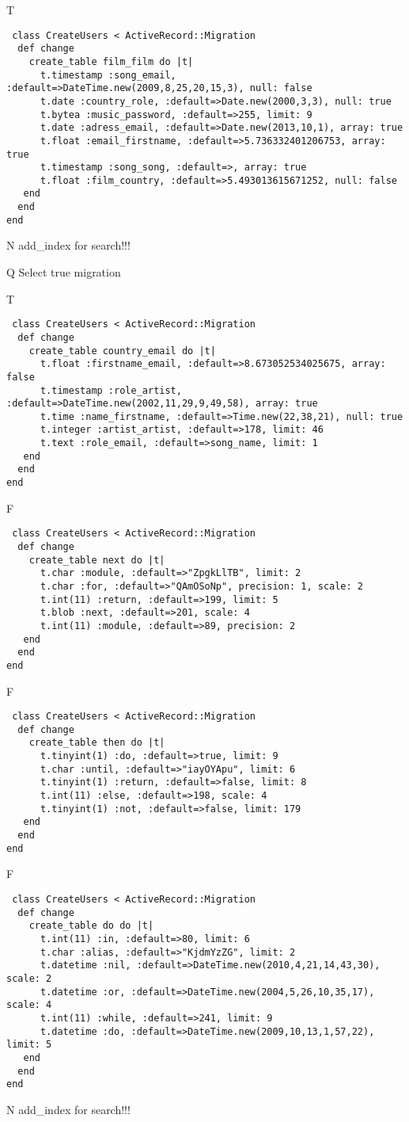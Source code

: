 T
\begin{verbatim}
 class CreateUsers < ActiveRecord::Migration 
  def change 
    create_table film_film do |t| 
      t.timestamp :song_email, :default=>DateTime.new(2009,8,25,20,15,3), null: false
      t.date :country_role, :default=>Date.new(2000,3,3), null: true
      t.bytea :music_password, :default=>255, limit: 9
      t.date :adress_email, :default=>Date.new(2013,10,1), array: true
      t.float :email_firstname, :default=>5.736332401206753, array: true
      t.timestamp :song_song, :default=>, array: true
      t.float :film_country, :default=>5.493013615671252, null: false
   end 
  end 
end
\end{verbatim}
N
add_index for search!!!
  
Q
Select true migration

T
\begin{verbatim}
 class CreateUsers < ActiveRecord::Migration 
  def change 
    create_table country_email do |t| 
      t.float :firstname_email, :default=>8.673052534025675, array: false
      t.timestamp :role_artist, :default=>DateTime.new(2002,11,29,9,49,58), array: true
      t.time :name_firstname, :default=>Time.new(22,38,21), null: true
      t.integer :artist_artist, :default=>178, limit: 46
      t.text :role_email, :default=>song_name, limit: 1
   end 
  end 
end
\end{verbatim}

F
\begin{verbatim}
 class CreateUsers < ActiveRecord::Migration 
  def change 
    create_table next do |t| 
      t.char :module, :default=>"ZpgkLlTB", limit: 2
      t.char :for, :default=>"QAmOSoNp", precision: 1, scale: 2
      t.int(11) :return, :default=>199, limit: 5
      t.blob :next, :default=>201, scale: 4
      t.int(11) :module, :default=>89, precision: 2
   end 
  end 
end
\end{verbatim}

F
\begin{verbatim}
 class CreateUsers < ActiveRecord::Migration 
  def change 
    create_table then do |t| 
      t.tinyint(1) :do, :default=>true, limit: 9
      t.char :until, :default=>"iayOYApu", limit: 6
      t.tinyint(1) :return, :default=>false, limit: 8
      t.int(11) :else, :default=>198, scale: 4
      t.tinyint(1) :not, :default=>false, limit: 179
   end 
  end 
end
\end{verbatim}

F
\begin{verbatim}
 class CreateUsers < ActiveRecord::Migration 
  def change 
    create_table do do |t| 
      t.int(11) :in, :default=>80, limit: 6
      t.char :alias, :default=>"KjdmYzZG", limit: 2
      t.datetime :nil, :default=>DateTime.new(2010,4,21,14,43,30), scale: 2
      t.datetime :or, :default=>DateTime.new(2004,5,26,10,35,17), scale: 4
      t.int(11) :while, :default=>241, limit: 9
      t.datetime :do, :default=>DateTime.new(2009,10,13,1,57,22), limit: 5
   end 
  end 
end
\end{verbatim}
N
add_index for search!!!
  
